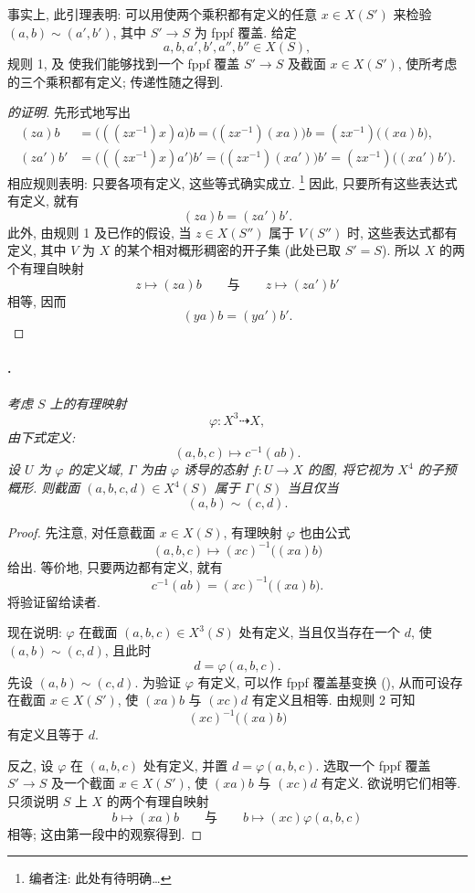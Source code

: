 事实上, 此引理表明: 可以用使两个乘积都有定义的任意 \(x\in X(S')\)
来检验 \((a,b)\sim(a',b')\), 其中 \(S'\to S\) 为 fppf 覆盖.
给定
\[
  a,b,a',b',a'',b''\in X(S),
\]
规则 1, 
及
使我们能够找到一个 fppf 覆盖 \(S'\to S\) 及截面 \(x\in X(S')\),
使所考虑的三个乘积都有定义; 传递性随之得到.

\begin{proof}[ 的证明]
先形式地写出
\[
\begin{aligned}
  (za)b
  &=\bigl(((zx^{-1})x)a\bigr)b
   =\bigl((zx^{-1})(xa)\bigr)b
   =(zx^{-1})\bigl((xa)b\bigr),\\
  (za')b'
  &=\bigl(((zx^{-1})x)a'\bigr)b'
   =\bigl((zx^{-1})(xa')\bigr)b'
   =(zx^{-1})\bigl((xa')b'\bigr).
\end{aligned}
\]
相应规则表明: 只要各项有定义, 这些等式确实成立.
\footnote{编者注: 此处有待明确\ldots}
因此, 只要所有这些表达式有定义, 就有
\[
  (za)b=(za')b'.
\]
此外, 由规则 1 及已作的假设,
当 \(z\in X(S'')\) 属于 \(V(S'')\) 时, 这些表达式都有定义,
其中 \(V\) 为 \(X\) 的某个相对概形稠密的开子集
(此处已取 \(S'=S\)).
所以 \(X\) 的两个有理自映射
\[
  z\longmapsto(za)b
  \qquad\text{与}\qquad
  z\longmapsto(za')b'
\]
相等, 因而
\[
  (ya)b=(ya')b'.
\]
\end{proof}

\paragraph{.}
\textit{考虑 \(S\) 上的有理映射
\[
  \varphi\colon X^3\dashrightarrow X,
\]
由下式定义:
\[
  (a,b,c)\longmapsto c^{-1}(ab).
\]
设 \(U\) 为 \(\varphi\) 的定义域,
\(\Gamma\) 为由 \(\varphi\) 诱导的态射 \(f\colon U\to X\) 的图,
将它视为 \(X^4\) 的子预概形.
则截面 \((a,b,c,d)\in X^4(S)\) 属于 \(\Gamma(S)\) 当且仅当
\[
  (a,b)\sim(c,d).
\]}

\begin{proof}
先注意, 对任意截面 \(x\in X(S)\), 有理映射 \(\varphi\) 也由公式
\[
  (a,b,c)\longmapsto(xc)^{-1}\bigl((xa)b\bigr)
\]
给出. 等价地, 只要两边都有定义, 就有
\[
  c^{-1}(ab)=(xc)^{-1}\bigl((xa)b\bigr).
\]
将验证留给读者.

现在说明: \(\varphi\) 在截面 \((a,b,c)\in X^3(S)\) 处有定义,
当且仅当存在一个 \(d\), 使 \((a,b)\sim(c,d)\), 且此时
\[
  d=\varphi(a,b,c).
\]
先设 \((a,b)\sim(c,d)\).
为验证 \(\varphi\) 有定义, 可以作 fppf 覆盖基变换
(),
从而可设存在截面 \(x\in X(S')\), 使 \((xa)b\) 与 \((xc)d\) 有定义且相等.
由规则 2 可知
\[
  (xc)^{-1}\bigl((xa)b\bigr)
\]
有定义且等于 \(d\).

反之, 设 \(\varphi\) 在 \((a,b,c)\) 处有定义,
并置 \(d=\varphi(a,b,c)\).
选取一个 fppf 覆盖 \(S'\to S\) 及一个截面 \(x\in X(S')\),
使 \((xa)b\) 与 \((xc)d\) 有定义.
欲说明它们相等. 只须说明 \(S\) 上 \(X\) 的两个有理自映射
\[
  b\longmapsto(xa)b
  \qquad\text{与}\qquad
  b\longmapsto(xc)\varphi(a,b,c)
\]
相等; 这由第一段中的观察得到.
\end{proof}

